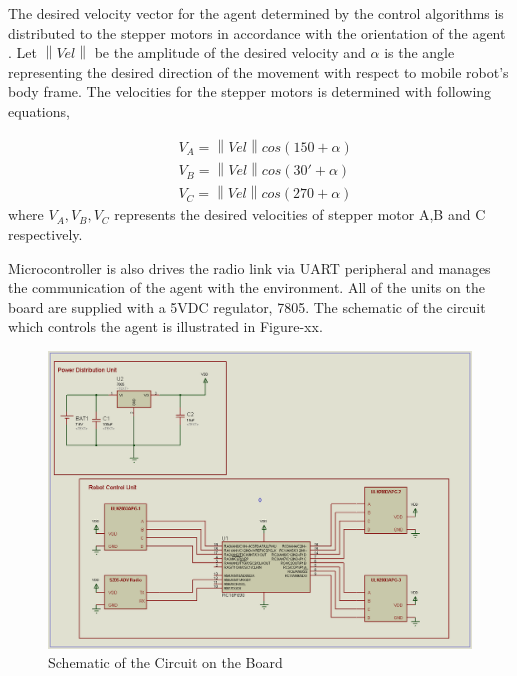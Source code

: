 \documentclass[twoside]{article}
\newcommand{\norm}[1]{\left\lVert#1\right\rVert}
\begin{document}
		
		The desired velocity vector for the agent determined by the control algorithms is  distributed to the stepper motors in accordance with the orientation of the agent . Let $\norm{Vel}$ be the amplitude of the desired velocity and $\alpha$ is the angle representing the desired direction of the movement with respect to mobile robot's body frame.  The velocities for the stepper motors is determined with following equations,
		
		\begin{align*}
		& V_A = \norm{Vel} cos(150+\alpha) \\
		& V_B = \norm{Vel} cos(30 ' +\alpha) \\
		& V_C = \norm{Vel} cos(270+\alpha) 
		\end{align*}  
	where $V_A, V_B, V_C$ represents the desired velocities of  stepper motor A,B and C respectively.
		
		
		Microcontroller is also drives the radio link via UART peripheral and manages the communication of the agent with the environment. All of the units on the board are supplied with a 5VDC regulator, 7805. The schematic of the circuit which controls the agent is illustrated in Figure-xx.
		
					\begin{figure}[H]
						\caption{Schematic of the Circuit on the Board}
						\centerline{\includegraphics[scale = 0.40]{sematik}}
					\end{figure} 
\end{document}
